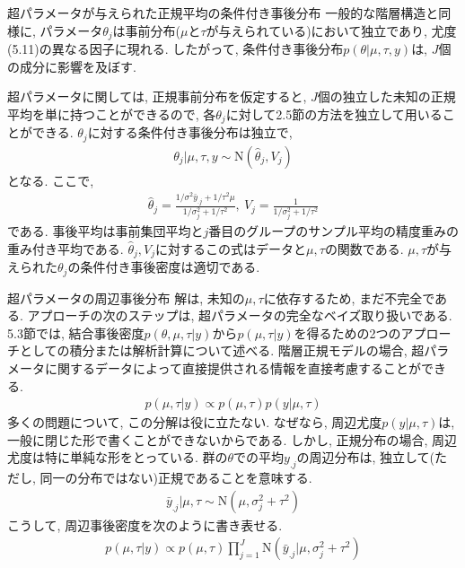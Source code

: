 \documentclass[10pt,dvipdfmx,a4]{beamer}
\newcommand{\eq}[1]{\begin{align}#1\end{align}}
\newcommand{\eqn}[1]{\begin{align*}#1\end{align*}}
\begin{document}
\begin{frame}{超パラメータが与えられた正規平均の条件付き事後分布}
一般的な階層構造と同様に, パラメータ$\theta_j$は事前分布($\mu$と$\tau$が与えられている)において独立であり, 尤度(5.11)の異なる因子に現れる.
したがって, 条件付き事後分布$p(\theta|\mu,\tau,y)$は, $J$個の成分に影響を及ぼす.

超パラメータに関しては, 正規事前分布を仮定すると, $J$個の独立した未知の正規平均を単に持つことができるので, 各$\theta_j$に対して2.5節の方法を独立して用いることができる.
$\theta_j$に対する条件付き事後分布は独立で,
\eqn{\theta_j|\mu,\tau,y\sim\text{N}(\hat{\theta}_j,V_j)}
となる.
ここで, 
\eq{\hat{\theta}_j=\tfrac{1/\sigma^2 \bar{y}_{.j}+1/\tau^2\mu}{1/\sigma_j^2+1/\tau^2},\ V_j=\tfrac{1}{1/\sigma_j^2+1/\tau^2}}
である.
事後平均は事前集団平均と$j$番目のグループのサンプル平均の精度重みの重み付き平均である.
$\hat{\theta}_j, V_j$に対するこの式はデータと$\mu,\tau$の関数である.
$\mu, \tau$が与えられた$\theta_j$の条件付き事後密度は適切である.
\end{frame}


\begin{frame}{超パラメータの周辺事後分布}
解は, 未知の$\mu,\tau$に依存するため, まだ不完全である.
アプローチの次のステップは, 超パラメータの完全なベイズ取り扱いである.
5.3節では, 結合事後密度$p(\theta,\mu,\tau|y)$から$p(\mu,\tau|y)$を得るための2つのアプローチとしての積分または解析計算について述べる.
階層正規モデルの場合, 超パラメータに関するデータによって直接提供される情報を直接考慮することができる.
\eqn{p(\mu,\tau|y)\propto p(\mu,\tau)p(y|\mu,\tau)}
多くの問題について, この分解は役に立たない.
なぜなら, 周辺尤度$p(y|\mu,\tau)$は, 一般に閉じた形で書くことができないからである.
しかし, 正規分布の場合, 周辺尤度は特に単純な形をとっている.
群の$\theta$での平均$y_{.j}$の周辺分布は, 独立して(ただし, 同一の分布ではない)正規であることを意味する.
\eqn{\bar{y}_{.j}|\mu,\tau\sim\text{N}(\mu,\sigma_j^2+\tau^2)}
こうして, 周辺事後密度を次のように書き表せる.
\eq{p(\mu,\tau|y)\propto p(\mu,\tau)\prod_{j=1}^J \text{N}(\bar{y}_{.j}|\mu,\sigma_j^2+\tau^2)}
\end{frame}

\end{document}
